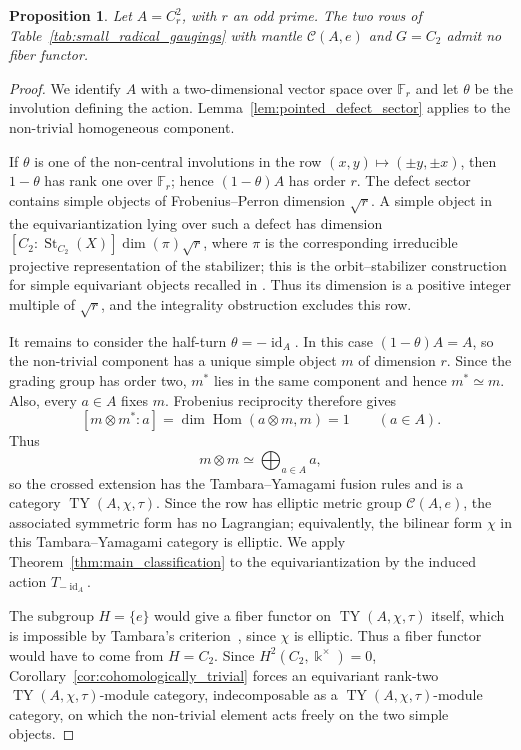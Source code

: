 \documentclass[12pt]{amsart}
\theoremstyle{plain}
\newtheorem{proposition}[theorem]{Proposition}
\theoremstyle{definition} %
\theoremstyle{remark} %
\newcommand{\ku}{{\Bbbk}} %
\newcommand{\cC}{\mathcal{C}}
\newcommand{\TY}{\operatorname{TY}}
\newcommand{\id}{\operatorname{id}}
\newcommand{\St}{\operatorname{St}}
\newcommand{\Hom}{\operatorname{Hom}}
\begin{document}
\begin{proposition}\label{prop:elliptic_four_r_squared_no_fiber}
Let $A=C_r^2$, with $r$ an odd prime. The two rows of Table~\ref{tab:small_radical_gaugings} with mantle $\cC(A,e)$ and $G=C_2$ admit no fiber functor.
\end{proposition}

\begin{proof}
We identify $A$ with a two-dimensional vector space over $\mathbb{F}_r$ and
let $\theta$ be the involution defining the action. Lemma~\ref{lem:pointed_defect_sector}
applies to the non-trivial homogeneous component.

If $\theta$ is one of the non-central involutions in the row
$(x,y)\mapsto(\pm y,\pm x)$, then $1-\theta$ has rank one over
$\mathbb{F}_r$; hence $(1-\theta)A$ has order $r$. The defect sector
contains simple objects of Frobenius--Perron dimension $\sqrt r$. A simple
object in the equivariantization lying over such a defect has dimension
$[C_2:\St_{C_2}(X)]\dim(\pi)\sqrt r$, where $\pi$ is the corresponding
irreducible projective representation of the stabilizer; this is the
orbit--stabilizer construction for simple equivariant objects recalled in
\cite[Subsection~7.5.1]{GP17}. Thus its dimension
is a positive integer multiple of $\sqrt r$, and the integrality obstruction
excludes this row.

It remains to consider the half-turn $\theta=-\id_A$. In this case
$(1-\theta)A=A$, so the non-trivial component has a unique simple object
$m$ of dimension $r$. Since the grading group has order two, $m^*$ lies in
the same component and hence $m^*\simeq m$. Also, every $a\in A$ fixes
$m$. Frobenius reciprocity therefore gives
\[
[m\otimes m^*:a]
=\dim\Hom(a\otimes m,m)=1
\qquad (a\in A).
\]
Thus
\[
m\otimes m\simeq\bigoplus_{a\in A}a,
\]
so the crossed extension has the Tambara--Yamagami fusion rules and is a
category $\TY(A,\chi,\tau)$. Since the row has elliptic metric group
$\cC(A,e)$, the associated symmetric form has no Lagrangian; equivalently,
the bilinear form $\chi$ in this Tambara--Yamagami category is elliptic.
We apply Theorem~\ref{thm:main_classification} to the equivariantization
by the induced action $T_{-\id_A}$.

The subgroup $H=\{e\}$ would give a fiber functor on $\TY(A,\chi,\tau)$ itself, which is impossible by Tambara's criterion~\cite[Propositions~4.1 and~4.2]{T00}, since $\chi$ is elliptic. Thus a fiber functor would have to come from $H=C_2$. Since $H^2(C_2,\ku^\times)=0$, Corollary~\ref{cor:cohomologically_trivial} forces an equivariant rank-two $\TY(A,\chi,\tau)$-module category, indecomposable as a $\TY(A,\chi,\tau)$-module category, on which the non-trivial element acts freely on the two simple objects.


\end{proof}
\end{document}
